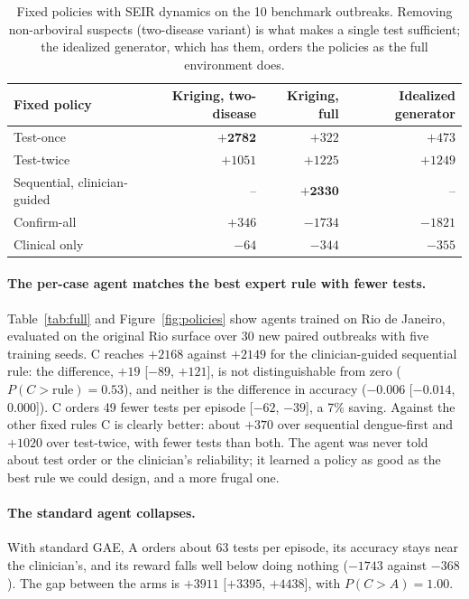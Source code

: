 \documentclass[11pt,a4paper]{article}
\begin{document}
\begin{table}[htbp]
\centering
\begin{tabular}{lrrr}
\toprule
\textbf{Fixed policy} & \textbf{Kriging, two-disease} & \textbf{Kriging, full} & \textbf{Idealized generator} \\ \midrule
Test-once & $\mathbf{+2782}$ & $+322$ & $+473$ \\
Test-twice & $+1051$ & $+1225$ & $+1249$ \\
Sequential, clinician-guided & -- & $\mathbf{+2330}$ & -- \\
Confirm-all & $+346$ & $-1734$ & $-1821$ \\
Clinical only & $-64$ & $-344$ & $-355$ \\ \bottomrule
\end{tabular}
\caption{Fixed policies with SEIR dynamics on the 10 benchmark outbreaks. Removing non-arboviral suspects (two-disease variant) is what makes a single test sufficient; the idealized generator, which has them, orders the policies as the full environment does.}
\label{tab:baselines}
\end{table}

\paragraph{The per-case agent matches the best expert rule with fewer tests.} Table~\ref{tab:full} and Figure~\ref{fig:policies} show agents trained on Rio de Janeiro, evaluated on the original Rio surface over 30 new paired outbreaks with five training seeds. C reaches $+2168$ against $+2149$ for the clinician-guided sequential rule: the difference, $+19$ [$-89$, $+121$], is not distinguishable from zero ($P(C>\text{rule}) = 0.53$), and neither is the difference in accuracy ($-0.006$ [$-0.014$, $0.000$]). C orders 49 fewer tests per episode [$-62$, $-39$], a 7\% saving. Against the other fixed rules C is clearly better: about $+370$ over sequential dengue-first and $+1020$ over test-twice, with fewer tests than both. The agent was never told about test order or the clinician's reliability; it learned a policy as good as the best rule we could design, and a more frugal one.

\paragraph{The standard agent collapses.} With standard GAE, A orders about 63 tests per episode, its accuracy stays near the clinician's, and its reward falls well below doing nothing ($-1743$ against $-368$). The gap between the arms is $+3911$ [$+3395$, $+4438$], with $P(C > A) = 1.00$.
\end{document}
